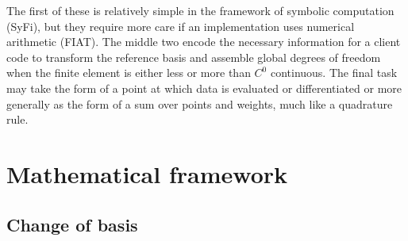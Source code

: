 The first of these is relatively simple in the framework
of symbolic computation (SyFi), but they require more care if an
implementation uses numerical arithmetic (FIAT).  The middle two
encode the necessary information for a client code to transform the
reference basis and assemble global degrees of freedom when the
finite element is either less or more than $C^0$ continuous. The final
task may take the form of a point at which data is evaluated or
differentiated or more generally as the form of a sum over points and
weights,  much like a quadrature rule.


\section{Mathematical framework}
\subsection{Change of basis}


